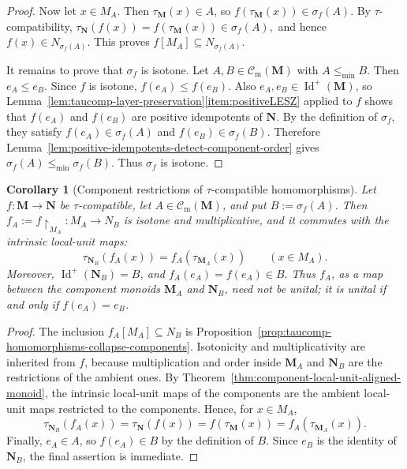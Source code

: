 \documentclass[pdflatex,sn-mathphys-num]{sn-jnl}
\theoremstyle{thmstyleone}%
\newtheorem{corollary}[theorem]{Corollary}
\theoremstyle{thmstyletwo}%
\theoremstyle{thmstylethree}%
\newcommand{\PosId}{\operatorname{Id}^{+}}
\newcommand{\Cm}{\mathcal C_{\mathrm m}}
\begin{document}
\begin{proof}
Now let \(x\in M_A\).
Then \(\tau_{\mathbf M}(x)\in A\), so \(f(\tau_{\mathbf M}(x))\in\sigma_f(A)\).
By \(\tau\)-compatibility, \(\tau_{\mathbf N}(f(x))=f(\tau_{\mathbf M}(x))\in\sigma_f(A),\) and hence \(f(x)\in N_{\sigma_f(A)}\).
This proves \(f[M_A]\subseteq N_{\sigma_f(A)}\).

It remains to prove that \(\sigma_f\) is isotone.
Let \(A,B\in\Cm(\mathbf M)\) with \(A\le_{\min}B\).
Then \(e_A\le e_B\).
Since \(f\) is isotone, \(f(e_A)\le f(e_B).\)
Also \(e_A,e_B\in\PosId(\mathbf M)\), so Lemma~\ref{lem:taucomp-layer-preservation}\eqref{item:positiveLESZ} applied to \(f\) shows that \(f(e_A)\) and \(f(e_B)\) are positive idempotents of \(\mathbf N\).
By the definition of \(\sigma_f\), they satisfy \(f(e_A)\in\sigma_f(A)\) and \(f(e_B)\in\sigma_f(B)\).
Therefore Lemma~\ref{lem:positive-idempotents-detect-component-order} gives \(\sigma_f(A)\le_{\min}\sigma_f(B)\).
Thus \(\sigma_f\) is isotone.
\end{proof}

\begin{corollary}[Component restrictions of \(\tau\)-compatible homomorphisms]
\label{cor:taucomp-component-restrictions}
Let \(f\colon\mathbf M\to\mathbf N\) be \(\tau\)-compatible, let \(A\in\Cm(\mathbf M)\), and put \(B:=\sigma_f(A)\).
Then \(f_A:=f\!\upharpoonright_{M_A}\colon M_A\to N_B \) is isotone and multiplicative, and it commutes with the intrinsic local-unit maps:
\[
\tau_{\mathbf N_B}(f_A(x)) = f_A(\tau_{\mathbf M_A}(x))
\qquad (x\in M_A).
\]
Moreover, \(\PosId(\mathbf N_B)=B\), and \(f_A(e_A)=f(e_A)\in B. \)
Thus \(f_A\), as a map between the component monoids \(\mathbf M_A\) and \(\mathbf N_B\), need not be unital; it is unital if and only if \(f(e_A)=e_B\).
\end{corollary}

\begin{proof}
The inclusion \(f_A[M_A]\subseteq N_B\) is Proposition~\ref{prop:taucomp-homomorphisms-collapse-components}.
Isotonicity and multiplicativity are inherited from \(f\), because multiplication and order inside \(\mathbf M_A\) and \(\mathbf N_B\) are the restrictions of the ambient ones.
By Theorem~\ref{thm:component-local-unit-aligned-monoid}, the intrinsic local-unit maps of the components are the ambient local-unit maps restricted to the components.
Hence, for \(x\in M_A\),
\[
\tau_{\mathbf N_B}(f_A(x))
=\tau_{\mathbf N}(f(x))
=f(\tau_{\mathbf M}(x))
=f_A(\tau_{\mathbf M_A}(x)).
\]
Finally, \(e_A\in A\), so \(f(e_A)\in B\) by the definition of \(B\).
Since \(e_B\) is the identity of \(\mathbf N_B\), the final assertion is immediate.
\end{proof}
\end{document}

